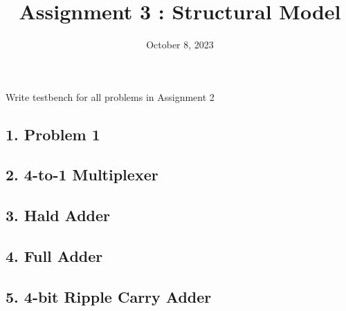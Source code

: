 \documentclass{vhdl-assignment}
\title{Assignment 3 : Structural Model}
\date{October 8, 2023}
\begin{document}
\maketitle
\thispagestyle{fancy}

\begin{problem}{Write testbench for all problems in Assignment 2}
    \subsection*{1. Problem 1}
    \subsection*{2. 4-to-1 Multiplexer}
    \subsection*{3. Hald Adder}
    \subsection*{4. Full Adder}
    \subsection*{5. 4-bit Ripple Carry Adder}
\end{problem}
\end{document}
